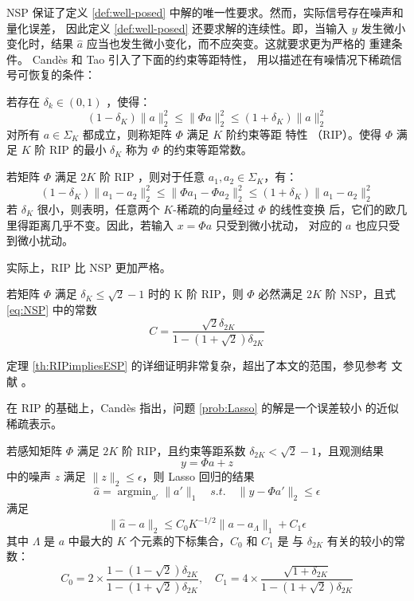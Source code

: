 NSP 保证了定义
\ref{def:well-posed} 中解的唯一性要求。然而，实际信号存在噪声和量化误差，
因此定义 \ref{def:well-posed} 还要求解的连续性。即，当输入 $y$ 发生微小
变化时，结果 $\hat a$ 应当也发生微小变化，而不应突变。这就要求更为严格的
重建条件。 Cand\`es 和 Tao 引入了下面的约束等距特性，
用以描述在有噪情况下稀疏信号可恢复的条件：
\begin{definition}[约束等距特性] 若存在 $\delta_k \in (0,1)$ ，使得：
\begin{equation}
(1 - \delta_K) \|a\|_2^2 \leq \|\Phi a\|_2^2 \leq (1 + \delta_K) \|a\|_2^2
\end{equation}
对所有 $a \in \Sigma_K$ 都成立，则称矩阵 $\Phi$ 满足 $K$ 阶约束等距
特性 （RIP）。使得 $\Phi$ 满足 $K$ 阶 RIP 的最小 $\delta_K$ 称为
$\Phi$ 的约束等距常数。
\end{definition}

若矩阵 $\Phi$ 满足 $2K$ 阶 RIP ，则对于任意 $a_1, a_2 \in \Sigma_K$，有：
\begin{equation}
(1 - \delta_K) \|a_1 - a_2\|_2^2 \leq \|\Phi a_1 - \Phi a_2\|_2^2
\leq (1 + \delta_K) \|a_1 - a_2\|_2^2
\end{equation}
若 $\delta_K$ 很小，则表明，任意两个 $K$-稀疏的向量经过 $\Phi$ 的线性变换
后，它们的欧几里得距离几乎不变。因此，若输入 $x = \Phi a$ 只受到微小扰动，
对应的 $a$ 也应只受到微小扰动。

实际上，RIP 比 NSP 更加严格。
\begin{theorem} \label{th:RIPimpliesESP}
若矩阵 $\Phi$ 满足 $\delta_K \leq \sqrt{2} - 1$ 时的 K 阶 RIP，则
$\Phi$ 必然满足 $2K$ 阶 NSP，且式 \ref{eq:NSP} 中的常数
\begin{equation}
C = \frac{\sqrt{2} \delta_{2K}}{1 - (1 + \sqrt{2}) \delta_{2K}}
\end{equation}
\end{theorem}

定理 \ref{th:RIPimpliesESP} 的详细证明非常复杂，超出了本文的范围，参见参考
文献 \cite{IntroCS}。

在 RIP 的基础上，Cand\`es 指出，问题 \ref{prob:Lasso} 的解是一个误差较小
的近似稀疏表示。
\begin{theorem} \label{th:l1recovery}
若感知矩阵 $\Phi$ 满足 $2K$ 阶 RIP，且约束等距系数 $\delta_{2K} < 
\sqrt{2} - 1$，且观测结果
\begin{equation} \label{eqn:observe}
y = \Phi a + z
\end{equation}
中的噪声 $z$ 满足 $\|z\|_2 \leq \epsilon$，则 Lasso 回归的结果
\begin{equation}
\hat a = \mathop{\arg\min}_{a'} \|a'\|_1 \quad s.t. \quad \|y-\Phi a'\|_2
\leq \epsilon
\end{equation}
满足
\begin{equation}
\|\hat a - a\|_2 \leq C_0 K^{-1/2} \|a - a_{\Lambda}\|_1 + C_1 \epsilon
\end{equation}
其中 $\Lambda$ 是 $a$ 中最大的 $K$ 个元素的下标集合，$C_0$ 和 $C_1$ 是
与 $\delta_{2K}$ 有关的较小的常数：
\begin{equation}
C_0 = 2 \times \frac{1 - (1-\sqrt{2}) \delta_{2K}}{1 - (1+\sqrt{2})
\delta_{2K}}, \quad C_1 = 4 \times \frac{\sqrt{1 + \delta_{2K}}}
{1 - (1 + \sqrt{2}) \delta_{2K}}
\end{equation}
\end{theorem}


